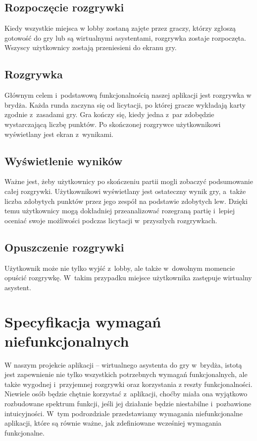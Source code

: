 \subsection{Rozpoczęcie rozgrywki}
Kiedy wszystkie miejsca w lobby zostaną zajęte przez graczy, którzy zgłoszą gotowość do gry
lub są wirtualnymi asystentami, rozgrywka zostaje rozpoczęta.
Wszyscy użytkownicy zostają przeniesieni do ekranu gry.


\subsection{Rozgrywka}
Głównym celem i~podstawową funkcjonalnością naszej aplikacji jest
rozgrywka w brydża. Każda runda zaczyna się od licytacji, po której
gracze wykładają karty zgodnie z~zasadami gry. Gra kończy się, kiedy
jedna z~par zdobędzie wystarczającą liczbę punktów. Po skończonej
rozgrywce użytkownikowi wyświetlany jest ekran z~wynikami.


\subsection{Wyświetlenie wyników}
Ważne jest, żeby użytkownicy po skończeniu partii mogli zobaczyć
podsumowanie całej rozgrywki. Użytkownikowi wyświetlany jest ostateczny
wynik gry, a~także liczba zdobytych punktów przez jego zespół na
podstawie zdobytych lew. Dzięki temu użytkownicy mogą dokładniej
przeanalizować rozegraną partię i~lepiej oceniać swoje możliwości
podczas licytacji w~przyszłych rozgrywkach.


\subsection{Opuszczenie rozgrywki}
Użytkownik może nie tylko wyjść z~lobby, ale także w~dowolnym momencie
opuścić rozgrywkę. W~takim przypadku miejsce użytkownika zastępuje
wirtualny asystent.




\section{Specyfikacja wymagań niefunkcjonalnych}
W naszym projekcie aplikacji -- wirtualnego asystenta do gry w~brydża,
istotą jest zapewnienie nie tylko wszystkich potrzebnych wymagań
funkcjonalnych, ale także wygodnej i~przyjemnej rozgrywki oraz
korzystania z reszty funkcjonalności. Niewiele osób będzie chętnie
korzystać z~aplikacji, choćby miała ona wyjątkowo rozbudowane spektrum
funkcji, jeśli jej działanie będzie niestabilne i~pozbawione
intuicyjności. W~tym podrozdziale przedstawiamy wymagania
niefunkcjonalne aplikacji, które są równie ważne, jak zdefiniowane
wcześniej wymagania funkcjonalne.
